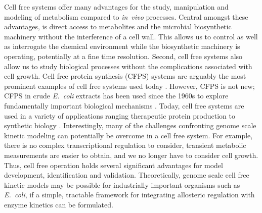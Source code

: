 \documentclass[12pt]{article}
\begin{document}
Cell free systems offer many advantages for the study, manipulation and modeling of metabolism compared to \textit{in~vivo} processes.
Central amongst these advantages, is direct access to metabolites and the microbial biosynthetic machinery without the interference of a cell wall. 
This allows us to control as well as interrogate the chemical environment while the biosynthetic machinery is operating, potentially at a fine time resolution.
Second, cell free systems also allow us to study biological processes without the complications associated with cell growth.
Cell free protein synthesis (CFPS) systems are arguably the most prominent examples of cell free systems used today \citep{Jewett:2008aa}.
However, CFPS is not new; CFPS in crude \emph{E.~coli} extracts has been used since the 1960s to explore fundamentally important biological mechanisms \citep{MATTHAEI:1961aa,NIRENBERG:1961aa}. 
Today, cell free systems are used in a variety of applications ranging therapeutic protein production \citep{Lu:2014aa} to synthetic biology \citep{Hodgman:2012aa}. 
Interestingly, many of the challenges confronting genome scale kinetic modeling can potentially be overcome in a cell free system. 
For example, there is no complex transcriptional regulation to consider, transient metabolic measurements are easier to obtain, and we no longer have to consider cell growth. 
Thus, cell free operation holds several significant advantages for model development, identification and validation.
Theoretically, genome scale cell free kinetic models may be possible for industrially important organisms such as \emph{E.~coli}, 
if a simple, tractable framework for integrating allosteric regulation with enzyme kinetics can be formulated.   
\end{document}
